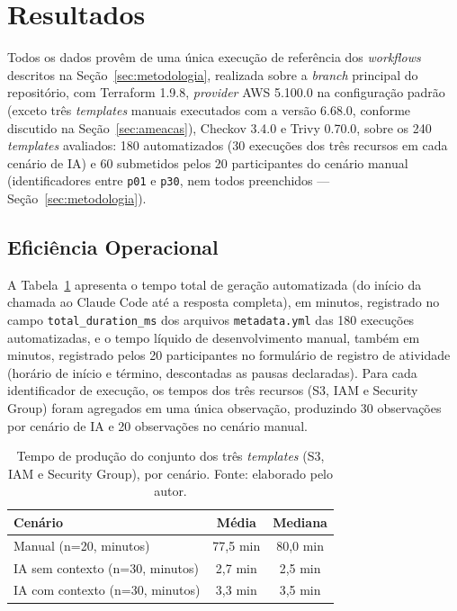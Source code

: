 \section{Resultados}
\label{sec:resultados}

Todos os dados provêm de uma única execução de referência dos \textit{workflows} descritos na Seção~\ref{sec:metodologia}, realizada sobre a \textit{branch} principal do repositório, com Terraform 1.9.8, \textit{provider} AWS 5.100.0 na configuração padrão (exceto três \textit{templates} manuais executados com a versão 6.68.0, conforme discutido na Seção~\ref{sec:ameacas}), Checkov 3.4.0 e Trivy 0.70.0, sobre os 240 \textit{templates} avaliados: 180 automatizados (30 execuções dos três recursos em cada cenário de IA) e 60 submetidos pelos 20 participantes do cenário manual (identificadores entre \texttt{p01} e \texttt{p30}, nem todos preenchidos — Seção~\ref{sec:metodologia}).

\subsection{Eficiência Operacional}

A Tabela~\ref{tab:tempo} apresenta o tempo total de geração automatizada (do início da chamada ao Claude Code até a resposta completa), em minutos, registrado no campo \texttt{total\_duration\_ms} dos arquivos \texttt{metadata.yml} das 180 execuções automatizadas, e o tempo líquido de desenvolvimento manual, também em minutos, registrado pelos 20 participantes no formulário de registro de atividade (horário de início e término, descontadas as pausas declaradas). Para cada identificador de execução, os tempos dos três recursos (S3, IAM e Security Group) foram agregados em uma única observação, produzindo 30 observações por cenário de IA e 20 observações no cenário manual.

\begin{table}[H]
\centering
\caption{Tempo de produção do conjunto dos três \textit{templates} (S3, IAM e Security Group), por cenário. Fonte: elaborado pelo autor.}
\label{tab:tempo}
\small
\begin{tabular}{l|c|c}
\hline
\textbf{Cenário} & \textbf{Média} & \textbf{Mediana} \\
\hline
Manual (n=20, minutos) & 77,5 min & 80,0 min \\
IA sem contexto (n=30, minutos) & 2,7 min & 2,5 min \\
IA com contexto (n=30, minutos) & 3,3 min & 3,5 min \\
\hline
\end{tabular}
\end{table}

